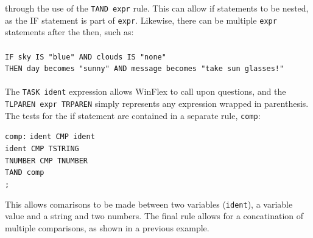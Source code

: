 \documentclass[12pt]{report}
\begin{document}
through the use of the \texttt{TAND expr} rule.  This can allow if statements to be nested, as the IF statement is part of \texttt{expr}. Likewise, there can be multiple \texttt{expr} statements after the then, such as:\\
\\
\texttt{IF sky IS "blue" AND clouds IS "none"\\
THEN day becomes "sunny" AND message becomes "take sun glasses!"}\\
\\
The \texttt{TASK ident} expression allows WinFlex to call upon questions, and the \texttt{TLPAREN expr TRPAREN} simply represents any expression wrapped in parenthesis.
The tests for the if statement are contained in a separate rule, \texttt{comp}:\\
\begin{tabbing}
\texttt{comp:} \= \texttt{ident CMP ident}\\
\> \texttt{\textbar \space ident CMP TSTRING}\\
\> \texttt{\textbar \space TNUMBER CMP TNUMBER}\\
\> \texttt{\textbar \space TAND comp}\\
\> \texttt{;}\\
\end{tabbing}
This allows comarisons to be made between two variables (\texttt{ident}), a variable value and a string and two numbers.  The final rule allows for a concatination of multiple comparisons, as shown in a previous example.
\end{document}
